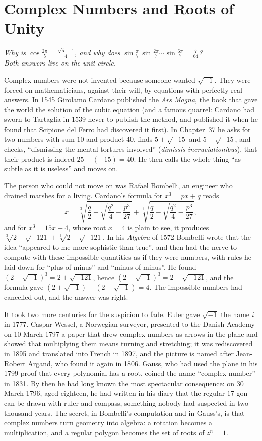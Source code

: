 \chapter{Complex Numbers and Roots of Unity}\label{ch:complex}

\begin{center}\itshape
Why is $\cos\frac{2\pi}5=\frac{\sqrt5-1}4$, and why does $\sin\frac\pi7\,\sin\frac{2\pi}7\cdots\sin\frac{6\pi}7=\frac7{64}$?\\
Both answers live on the unit circle.
\end{center}

Complex numbers were not invented because someone wanted $\sqrt{-1}$. They were forced on mathematicians, against their will, by equations
with perfectly real answers. In 1545 Girolamo Cardano published the \emph{Ars Magna}, the book that gave the world the solution of the cubic
equation (and a famous quarrel: Cardano had sworn to Tartaglia in 1539 never to publish the method, and published it when he found that Scipione
del Ferro had discovered it first). In Chapter~37 he asks for two numbers with sum $10$ and product $40$, finds $5+\sqrt{-15}$ and $5-\sqrt{-15}$,
and checks, ``dismissing the mental tortures involved'' (\emph{dimissis incruciationibus}), that their product is indeed $25-(-15)=40$. He then calls
the whole thing ``as subtle as it is useless'' and moves on.

The person who could not move on was Rafael Bombelli, an engineer who drained marshes for a living. Cardano's formula for $x^3=px+q$ reads
\[
x=\sqrt[3]{\frac q2+\sqrt{\frac{q^2}4-\frac{p^3}{27}}}+\sqrt[3]{\frac q2-\sqrt{\frac{q^2}4-\frac{p^3}{27}}},
\]
and for $x^3=15x+4$, whose root $x=4$ is plain to see, it produces $\sqrt[3]{2+\sqrt{-121}}+\sqrt[3]{2-\sqrt{-121}}$. In his \emph{Algebra} of 1572
Bombelli wrote that the idea ``appeared to me more sophistic than true'', and then had the nerve to compute with these impossible quantities as if
they were numbers, with rules he laid down for ``plus of minus'' and ``minus of minus''. He found $(2+\sqrt{-1})^3=2+\sqrt{-121}$, hence
$(2-\sqrt{-1})^3=2-\sqrt{-121}$, and the formula gave $(2+\sqrt{-1})+(2-\sqrt{-1})=4$. The impossible numbers had cancelled out, and the answer was right.

It took two more centuries for the suspicion to fade. Euler gave $\sqrt{-1}$ the name $i$ in 1777. Caspar Wessel, a Norwegian surveyor, presented to
the Danish Academy on 10 March 1797 a paper that drew complex numbers as arrows in the plane and showed that multiplying them means turning and
stretching; it was rediscovered in 1895 and translated into French in 1897, and the picture is named after Jean-Robert Argand, who found it again in 1806. Gauss, who had used the plane
in his 1799 proof that every polynomial has a root, coined the name ``complex number'' in 1831. By then he had long known the most spectacular
consequence: on 30 March 1796, aged eighteen, he had written in his diary that the regular $17$-gon can be drawn with ruler and compass,
something nobody had suspected in two thousand years. The secret, in Bombelli's computation and in Gauss's, is that complex numbers turn geometry
into algebra: a rotation becomes a multiplication, and a regular polygon becomes the set of roots of $z^n=1$.

